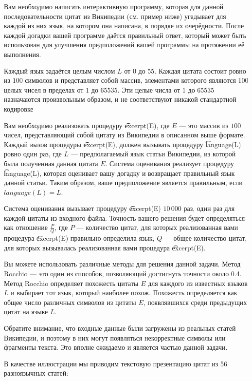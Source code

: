 Вам необходимо написать интерактивную программу, которая для данной последовательности цитат из Википедии (см. пример ниже) угадывает для каждой из них язык, на котором она написана, в порядке их очерёдности. После каждой догадки вашей программе даётся правильный ответ, который может быть использован для улучшения предположений вашей программы на протяжении её выполнения.

Каждый язык задаётся целым числом $L$ от $0$ до $55$. Каждая цитата состоит ровно из $100$ символов и представляет собой массив, элементами которого являются $100$ целых чисел в пределах от $1$ до $65535$. Эти целые числа от $1$ до $65535$ назначаются произвольным образом, и не соответствуют никакой стандартной кодировке

Вам необходимо реализовать процедуру \t{excerpt(E)}, где $E$ --- это массив из $100$ чисел, представляющий собой цитату из Википедии в описанном выше формате. Каждый вызов процедуры \t{excerpt(E)}, должен вызывать процедуру \t{language(L)} ровно один раз, где $L$ --- предполагаемый язык статьи Википедии, из которой была полученная данная цитата $E$. Система оценивания реализует процедуру \t{language(L)}, которая оценивает вашу догадку и возвращает правильный язык данной статьи. Таким образом, ваше предположение является правильным, если $language(L) = L$.

Система оценивания вызывает процедуру \t{excerpt(E)} $10\,000$ раз, один раз для каждой цитаты из входного файла. Точность вашего решения будет определяться как отношение $\frac{P}{Q}$, где $P$ --- количество цитат, для которых реализованная вами процедура \t{excerpt(E)} правильно определила язык, $Q$ --- общее количество цитат, для которых вызывалась реализованная вами процедура \t{excerpt(E)}.

Вы можете использовать различные методы для решения данной задачи. Метод Rocchio --- это один из способов, позволяющий достигнуть точности около 0.4. Метод Rocchio определяет похожесть цитаты $E$ для каждого из известных языков $L$ и выбирает тот язык, который наиболее похож. Похожесть определяется как общее число различных символов из цитаты $E$, появлявшихся среди предыдущих цитат на языке $L$.

Обратите внимание, что входные данные были загружены из реальных статей Википедии, и поэтому в них могут появляться некорректные символы или фрагменты текста. Это вполне ожидаемо и является частью данной задачи.

В качестве иллюстрации мы приводим текстовую презентацию цитат из 56 разноязычных
статей:

